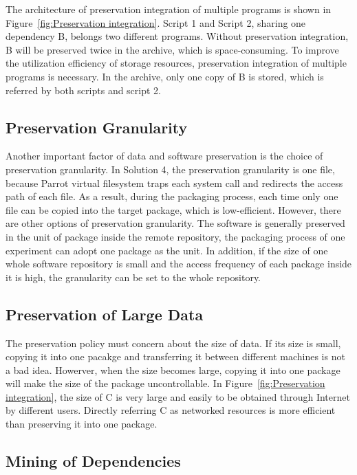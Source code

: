 \documentclass{acm_proc_article-sp}
\begin{document}
The architecture of preservation integration of multiple programs is shown in
Figure~\ref{fig:Preservation integration}. Script 1 and Script 2, sharing one
dependency B, belongs two different programs. Without preservation
integration, B will be preserved twice in the archive, which is
space-consuming. To improve the utilization efficiency of storage resources,
preservation integration of multiple programs is necessary. In the archive,
only one copy of B is stored, which is referred by both scripts and script 2.

\subsection{Preservation Granularity}

Another important factor of data and software preservation is the choice of
preservation granularity. In Solution 4, the preservation granularity is one
file, because Parrot virtual filesystem traps each system call and redirects
the access path of each file. As a result, during the packaging process, each
time only one file can be copied into the target package, which is
low-efficient. However, there are other options of preservation granularity.
The software is generally preserved in the unit of package inside the remote
repository, the packaging process of one experiment can adopt one package as
the unit. In addition, if the size of one whole software repository is small
and the access frequency of each package inside it is high, the granularity can
be set to the whole repository.

\subsection{Preservation of Large Data}

The preservation policy must concern about the size of data. If its size is
small, copying it into one pacakge and transferring it between different
machines is not a bad idea. Howerver, when the size becomes large, copying it
into one package will make the size of the package uncontrollable. In
Figure~\ref{fig:Preservation integration}, the size of C is very large and
easily to be obtained through Internet by different users. Directly referring C
as networked resources is more efficient than preserving it into one package.

\subsection{Mining of Dependencies} 
\end{document}
